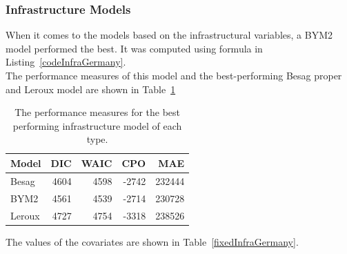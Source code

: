 \subsubsection{Infrastructure Models}\label{sssec:infraGermany}
When it comes to the models based on the infrastructural variables, a BYM2 model performed the best. It was computed using formula in Listing~\ref{codeInfraGermany}. \\
The performance measures of this model and the best-performing Besag proper and Leroux model are shown in Table~\ref{infraGermany}
\begin{table}[H] 
\caption{The performance measures for the best performing infrastructure model of each type. \label{infraGermany}}
\begin{tabular}{l r r r r}
\toprule
\textbf{Model}	& \textbf{DIC}	& \textbf{WAIC} & \textbf{CPO} & \textbf{MAE}\\
\midrule
Besag & 4604 & 4598 & -2742 & 232444\\
BYM2 & 4561 & 4539 & -2714 & 230728\\
Leroux & 4727 & 4754 & -3318 & 238526\\
\bottomrule
\end{tabular}
\end{table}
The values of the covariates are shown in Table~\ref{fixedInfraGermany}.
